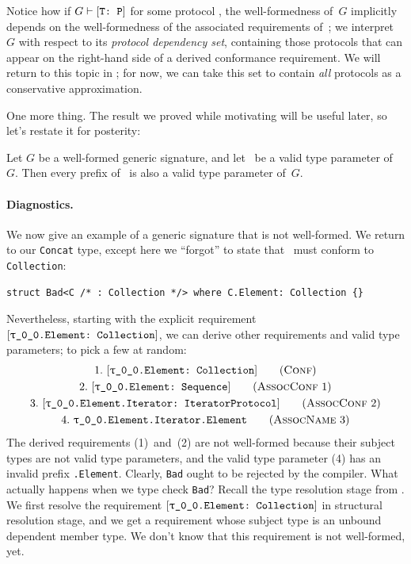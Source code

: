 \documentclass[../generics]{subfiles}
\begin{document}
Notice how if $G\vdash[\texttt{T:~P}]$ for some protocol \tP, the well-formedness of~$G$ implicitly depends on the well-formedness of the associated requirements of~\tP; we interpret~$G$ with respect to its \emph{protocol dependency set}, containing those protocols that can appear on the right-hand side of a derived conformance requirement. We will return to this topic in ; for now, we can take this set to contain \emph{all} protocols as a conservative approximation.

One more thing. The result we proved while motivating  will be useful later, so let's restate it for posterity:
\begin{proposition}\label{prefix prop}
Let $G$ be a well-formed generic signature, and let \tT\ be a valid type parameter of~$G$. Then every prefix of \tT\ is also a valid type parameter of~$G$.
\end{proposition}

\paragraph{Diagnostics.} We now give an example of a generic signature that is not well-formed. We return to our \texttt{Concat} type, except here we ``forgot'' to state that \tC\ must conform to \texttt{Collection}:
\begin{Verbatim}
struct Bad<C /* : Collection */> where C.Element: Collection {}
\end{Verbatim}
Nevertheless, starting with the explicit requirement $\ConfReq{\rT.Element}{Collection}$, we can derive other requirements and valid type parameters; to pick a few at random:
\begin{gather*}
\ConfStep{\rT.Element}{Collection}{1}\\
\AssocConfStep{1}{\rT.Element}{Sequence}{2}\\
\AssocConfStep{2}{\rT.Element.Iterator}{IteratorProtocol}{3}\\
\AssocNameStep{3}{\rT.Element.Iterator.Element}{4}
\end{gather*}
The derived requirements (1)~and~(2) are not well-formed because their subject types are not valid type parameters, and the valid type parameter (4) has an invalid prefix \texttt{\rT.Element}. Clearly, \texttt{Bad} ought to be rejected by the compiler. What actually happens when we type check \texttt{Bad}? Recall the type resolution stage from . We first resolve the requirement $\ConfReq{\rT.Element}{Collection}$ in structural resolution stage, and we get a requirement whose subject type is an unbound dependent member type. We don't know that this requirement is not well-formed, yet.
\end{document}
